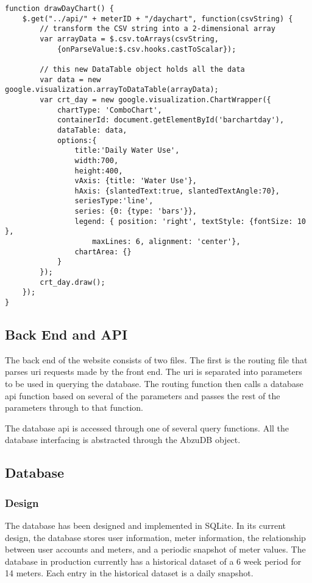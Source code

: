 \documentclass[journal]{IEEEtran}
\begin{document}
\begin{lstlisting}
function drawDayChart() {
    $.get("../api/" + meterID + "/daychart", function(csvString) {
        // transform the CSV string into a 2-dimensional array
        var arrayData = $.csv.toArrays(csvString,
            {onParseValue:$.csv.hooks.castToScalar});

        // this new DataTable object holds all the data
        var data = new google.visualization.arrayToDataTable(arrayData);
        var crt_day = new google.visualization.ChartWrapper({
            chartType: 'ComboChart',
            containerId: document.getElementById('barchartday'),
            dataTable: data,
            options:{
                title:'Daily Water Use',
                width:700,
                height:400,
                vAxis: {title: 'Water Use'},
                hAxis: {slantedText:true, slantedTextAngle:70},
                seriesType:'line',
                series: {0: {type: 'bars'}},
                legend: { position: 'right', textStyle: {fontSize: 10 },
                    maxLines: 6, alignment: 'center'},
                chartArea: {}
            }
        });
        crt_day.draw();
    });
}
\end{lstlisting}

\subsection{Back End and API}
The back end of the website consists of two files. The first is the routing file that parses uri requests made by the front end. The uri is separated into parameters to be used in querying the database. The routing function then calls a database api function based on several of the parameters and passes the rest of the parameters through to that function.

The database api is accessed through one of several query functions.
All the database interfacing is abstracted through the AbzuDB object.

\subsection{Database}
\subsubsection{Design}
The database has been designed and implemented in SQLite. In its current design, the database stores user information, meter information, the relationship between user accounts and meters, and a periodic snapshot of meter values. The database in production currently has a historical dataset of a 6 week period for 14 meters. Each entry in the historical dataset is a daily snapshot.
\end{document}
